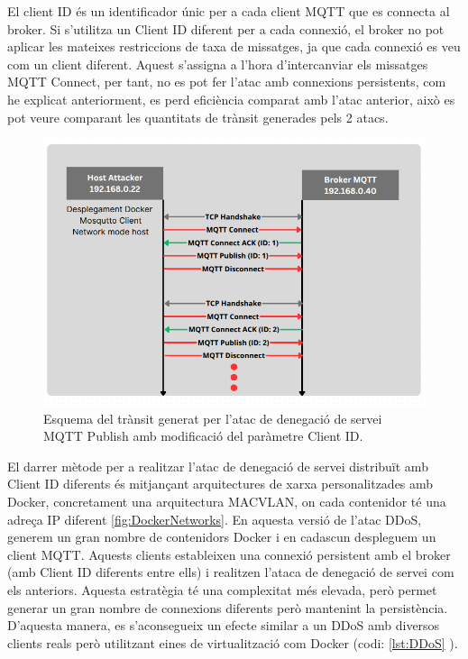 El client ID és un identificador únic per a cada client MQTT que es connecta al broker. Si s'utilitza un Client ID diferent per a cada connexió, el broker no pot aplicar les mateixes restriccions de taxa de missatges, ja que cada connexió es veu com un client diferent. Aquest s'assigna a l'hora d'intercanviar els missatges MQTT Connect, per tant, no es pot fer l'atac amb connexions persistents, com he explicat anteriorment, es perd eficiència comparat amb l'atac anterior, això es pot veure comparant les quantitats de trànsit generades pels 2 atacs.

  \begin{figure}[H]
    \centering
    \includegraphics[width=1\textwidth]{img/DoSclientID.png}
    \caption{Esquema del trànsit generat per l'atac de denegació de servei MQTT Publish amb modificació del paràmetre Client ID.}
    \label{fig:DoSclientId}
  \end{figure}

El darrer mètode per a realitzar l'atac de denegació de servei distribuït amb Client ID diferents és mitjançant arquitectures de xarxa personalitzades amb Docker, concretament una arquitectura MACVLAN, on cada contenidor té una adreça IP diferent \ref{fig:DockerNetworks}. En aquesta versió de l'atac DDoS, generem un gran nombre de contenidors Docker i en cadascun despleguem un client MQTT. Aquests clients estableixen una connexió persistent amb el broker (amb Client ID diferents entre ells) i realitzen l'ataca de denegació de servei com els anteriors. Aquesta estratègia té una complexitat més elevada, però permet generar un gran nombre de connexions diferents però mantenint la persistència. D'aquesta manera, es s'aconsegueix un efecte similar a un DDoS amb diversos clients reals però utilitzant eines de virtualització com Docker (codi: \ref{lst:DDoS} ).


